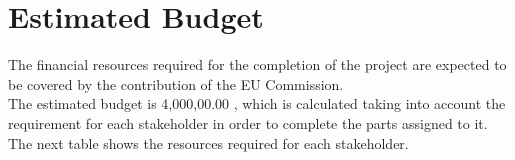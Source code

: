 \section{Estimated Budget}

The financial resources required for the completion of the project are expected to be covered by the contribution of the EU Commission.\\

The estimated budget is 4,000,00.00 \EUR, which is calculated taking into account the requirement for each stakeholder in order to complete the parts assigned to it. The next table shows the resources required for each stakeholder.


\begin{table}[H]
\centering
\caption{Breakdown of the project budget (units in euros).}
\label{my-label}
\end{table}
